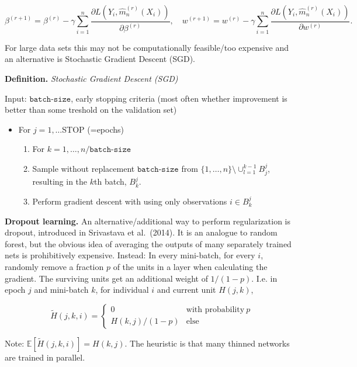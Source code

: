 \documentclass[
]{book}
\providecommand{\tightlist}{%
  \setlength{\itemsep}{0pt}\setlength{\parskip}{0pt}}
\begin{document}
\[
\beta^{(r+1)}= \beta^{(r)} -\gamma \sum_{i=1}^n\frac{\partial L(Y_i,\hat m_n^{(r)}(X_i))}{\partial \beta^{(r)}},  \quad
w^{(r+1)}= w^{(r)} -\gamma  \sum_{i=1}^n \frac{\partial L(Y_i,\hat m_n^{(r)}(X_i))}{\partial w^{(r)}}.
\]

For large data sets this may not be computationally feasible/too expensive and an alternative is Stochastic Gradient Descent (SGD).

\textbf{Definition.} \emph{Stochastic Gradient Descent (SGD)}

Input: \(\texttt{batch-size}\), early stopping criteria (most often whether improvement is better than some treshold on the validation set)

\begin{itemize}
\tightlist
\item
  For \(j=1,\dots\)STOP (=epochs)

  \begin{enumerate}
  \def\labelenumi{\arabic{enumi}.}
  \tightlist
  \item
    For \(k=1,\dots, n/\texttt{batch-size}\)
  \item
    Sample without replacement \(\texttt{batch-size}\) from \(\{1,\dots,n\}\setminus \cup_{l=1}^{k-1}B_j^j\), resulting in the \(k\)th batch, \(B_k^j\).
  \item
    Perform gradient descent with using only observations \(i \in B_k^j\)
  \end{enumerate}
\end{itemize}

\textbf{Dropout learning.} An alternative/additional way to perform regularization is dropout, introduced in Srivastava et al.~(2014). It is an analogue to random forest, but the obvious idea of averaging the outputs of many separately trained nets is prohibitively expensive. Instead: In every mini-batch, for every \(i\), randomly remove a fraction \(p\) of the units in a layer when calculating the gradient. The surviving units get an additional weight of \(1/(1 − p)\). I.e. in epoch \(j\) and mini-batch \(k\), for individual \(i\) and current unit \(H(j,k)\),

\[
\widetilde H(j,k,i)=\begin{cases}0 & \text{with probability}\  p \\ H(k,j)/(1 − p) &\text{else}\end{cases}
\]

Note: \(\mathbb E[\widetilde H(j,k,i)]=H(k,j)\). The heuristic is that many thinned networks are trained in parallel.
\end{document}
